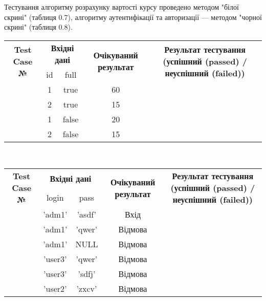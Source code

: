 Тестування алгоритму розрахунку вартості курсу проведено методом "білої скрині" (таблиця 0.7), алгоритму аутентифікації та авторизації --- методом "чорної скрині" (таблиця 0.8).
\def\tcn{\addtocounter{tcnt}{1} \thetcnt}
\begin{tabular}{|c|c|c|c|c|}
\hline
\multirow{2}{23mm}{\centering \textbf{Test Case №}} &
\multicolumn{2}{|c|}{\textbf{Вхідні дані}} &
\multirow{2}{27mm}{\centering \textbf{Очікуваний результат}} &
\multirow{2}{77mm}{\centering \textbf{Результат тестування (успішний (passed) / неуспішний (failed))}} \tabularnewline
\cline{2-3}
&id&full&&\tabularnewline
\hline
\tcn& 1	& true	& 60	&	\\
\tcn& 2	& true	& 15	&	\\
\tcn& 1	& false	& 20	&	\\
\tcn& 2	& false	& 15	&	\\
\hline
\end{tabular}
\setcounter{tcnt}{0}
\\
\begin{tabular}{|c|c|c|c|c|}
\hline
\multirow{2}{18mm}{\centering \textbf{Test Case №}} &
\multicolumn{2}{|c|}{\textbf{Вхідні дані}} &
\multirow{2}{27mm}{\centering \textbf{Очікуваний результат}} &
\multirow{2}{75mm}{\centering \textbf{Результат тестування (успішний (passed) / неуспішний (failed))}} \tabularnewline
\cline{2-3}
&login&pass&&\tabularnewline
\hline
\tcn& 'adm1'	& 'asdf'	& Вхід		&	\\
\tcn& 'adm1'	& 'qwer'	& Відмова	&	\\
\tcn& 'adm1'	& NULL		& Відмова	&	\\
\tcn& 'user3'	& 'qwer'	& Відмова	&	\\
\tcn& 'user3'	& 'sdfj'	& Відмова	&	\\
\tcn& 'user2'	& 'zxcv'	& Відмова	&	\\
\hline
\end{tabular}
